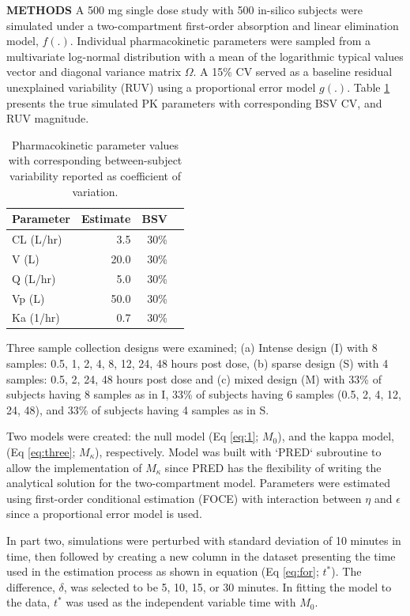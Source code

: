\documentclass[final]{beamer}
\newlength{\colwidth}
\begin{document}
\begin{frame}[t]
\begin{columns}[t]
\begin{column}{\colwidth}
\begin{block}{\textbf{METHODS}}
A 500 mg single dose study with 500 in-silico subjects were simulated under a two-compartment first-order absorption and linear elimination model, $f(.)$. Individual pharmacokinetic parameters were sampled from a multivariate log-normal distribution with a mean of the logarithmic typical values vector and diagonal variance matrix $\Omega$. A 15\% CV served as a baseline residual unexplained variability (RUV) using a proportional error model $g(.)$. Table \ref{tab:1} presents the true simulated PK parameters with corresponding BSV CV, and RUV magnitude.   
\begin{table}
		\label{tab:1}
      \centering
      \begin{tabular}{l r r c}
        \toprule
        \textbf{Parameter} & \textbf{Estimate} & \textbf{BSV} \\
        \midrule
        CL (L/hr) & 3.5 & 30\% \\
        V (L)& 20.0 & 30\% \\
        Q (L/hr)& 5.0 & 30\%  \\
        Vp (L)& 50.0 & 30\% \\
        Ka (1/hr)& 0.7 & 30\% \\
        \bottomrule
      \end{tabular}
      \caption{Pharmacokinetic parameter values with corresponding between-subject variability reported as coefficient of variation. }
    \end{table}
Three sample collection designs were examined; (a) Intense design (I) with 8 samples: 0.5, 1, 2, 4, 8, 12, 24, 48 hours post dose, (b) sparse design (S) with 4 samples: 0.5, 2, 24, 48 hours post dose and (c) mixed design (M) with 33\% of subjects having 8 samples as in I, 33\%  of subjects having 6 samples (0.5, 2, 4, 12, 24, 48), and 33\% of subjects having 4 samples as in S.\par
Two models were created: the null model (Eq \ref{eq:1}; $M_0$), and the kappa model, (Eq \ref{eq:three};  $M_\kappa$), respectively. Model was built with `PRED` subroutine to allow the implementation of $M_\kappa$ since PRED has the flexibility of writing the analytical solution for the two-compartment model. Parameters were estimated using first-order conditional estimation (FOCE) with interaction between $\eta$ and $\epsilon$ since a proportional error model is used.\par
In part two, simulations were perturbed with standard deviation of 10 minutes  in time, then followed by creating a new column in the dataset presenting the time used in the estimation process as shown in equation (Eq \ref{eq:for}; $t^*$). The difference, $\delta$, was selected to be 5, 10, 15, or 30 minutes. In fitting the model to the data, $t^*$ was used as the independent variable time with $M_0$.\par

\end{block}
\end{column}
\end{columns}
\end{frame}
\end{document}
